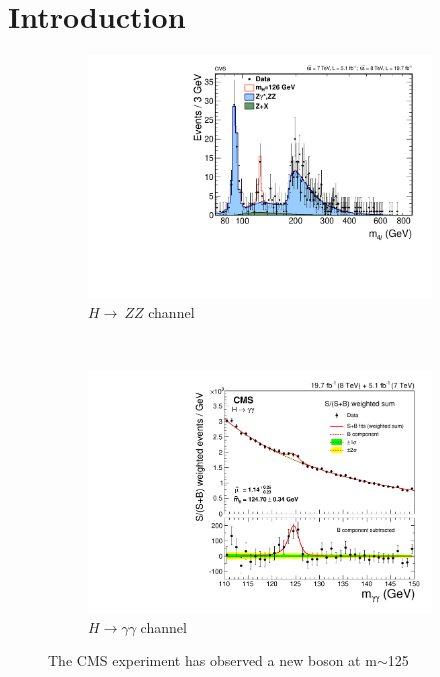 \chapter{Introduction}
\label{introduction}

\begin{figure}
    \centering
    \begin{subfigure}[b]{0.45\textwidth}
        \label{fig:qft_lo_ee_scattering}
        \includegraphics[width=\textwidth]{Figures/Experimental_Results/ZZMass_7Plus8TeV_70-1000_3GeV.pdf}
        \caption{$H\rightarrow~ZZ$ channel \cite{CMS:HZZ_4L_Twiki}}
      \end{subfigure}
      ~ %
      \begin{subfigure}[b]{0.45\textwidth}
          \label{fig:qft_nlo_ee_scattering}
          \includegraphics[width=\textwidth]{Figures/Experimental_Results/CmsHggMass.pdf}
          \caption{$H\rightarrow\gamma\gamma$ channel \cite{CMS:HGG_Twiki}}
      \end{subfigure}
      \caption{The CMS experiment has observed a new boson at m$\sim$125\GeVcc} \label{fig:cms_hZZ_hgg_results}
\end{figure}

